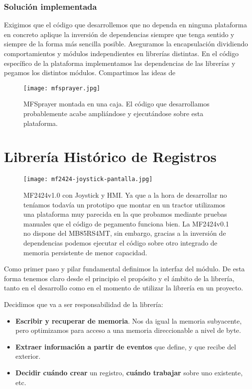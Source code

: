\subsubsection{Solución implementada}

Exigimos que el código que desarrollemos que no dependa en ninguna
plataforma en concreto aplique la inversión de dependencias siempre
que tenga sentido y siempre de la forma más sencilla posible. Aseguramos la
encapsulación dividiendo comportamientos y módulos independientes
en librerías distintas. En el código específico de la plataforma
implementamos las dependencias de las librerías y pegamos los distintos
módulos. Compartimos las ideas de \cite[Modularity: Glue Layers]{ArtOfUnixProgramming}

\begin{figure}[!h]
    \centering
    \texttt{[image: mfsprayer.jpg]}
    \caption{MFSprayer montada en una caja. El código que desarrollamos
    probablemente acabe ampliándose y ejecutándose sobre esta plataforma.}
\end{figure}

\section{Librería Histórico de Registros}

\begin{figure}[h]
    \centering
    \texttt{[image: mf2424-joystick-pantalla.jpg]}
    \caption{MF2424v1.0 con Joystick y HMI. Ya que a la hora de desarrollar
    no teníamos todavía un prototipo que montar en un tractor utilizamos
    una plataforma muy parecida en la que probamos mediante pruebas manuales
    que el código de pegamento funciona bien. La MF2424v0.1 no dispone del
    MB85RS4MT, sin embargo, gracias a la inversión de dependencias podemos
    ejecutar el código sobre otro integrado de memoria persistente de menor
    capacidad.}
\end{figure}

Como primer paso y pilar fundamental definimos la interfaz del
módulo. De esta forma tenemos claro desde el principio el propósito
y el ámbito de la librería, tanto en el desarrollo como en el momento
de utilizar la librería en un proyecto.

Decidimos que va a ser responsabilidad de la librería:
\begin{itemize}[noitemsep,nolistsep]
    \item \textbf{Escribir y recuperar de memoria}. Nos da igual
          la memoria subyacente, pero optimizamos para acceso a una
          memoria direccionable a nivel de byte.
    \item \textbf{Extraer información a partir de eventos} que define, y que
          recibe del exterior.
    \item \textbf{Decidir cuándo crear} un registro, \textbf{cuándo trabajar} sobre
          uno existente, etc.
\end{itemize}

